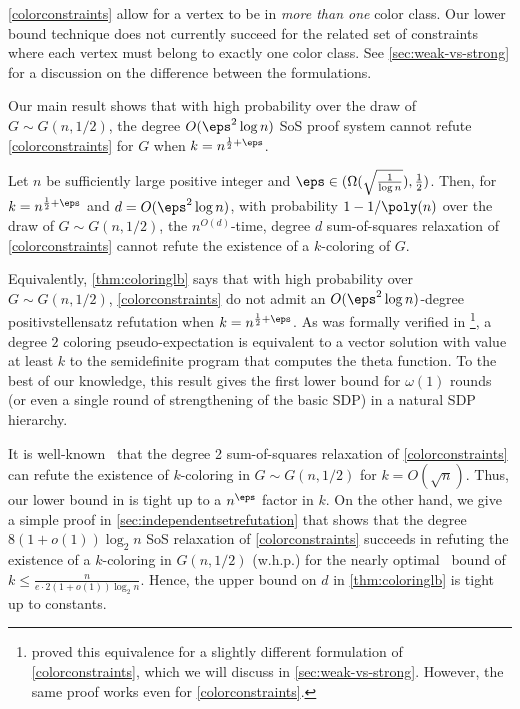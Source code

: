 \cref{colorconstraints} allow for a vertex to be in \emph{more than one} color class. Our lower bound technique does not currently succeed for the related set of constraints where each vertex must belong to exactly one color class. See \cref{sec:weak-vs-strong} for a discussion on the difference between the formulations.

Our main result shows that with high probability over the draw of $G \sim G(n,1/2)$, the degree $O(\eps^2 \log n)$ SoS proof system cannot refute \cref{colorconstraints} for $G$ when $k = n^{\frac{1}{2} + \eps}$. 

\begin{mtheorem}
\label{thm:coloringlb}
Let $n$ be sufficiently large positive integer and $\eps \in (\Omega(\sqrt{\frac{1}{\log n}}), \frac{1}{2})$. Then, for $k = n^{\frac{1}{2} + \eps}$ and $d = O(\eps^2 \log n)$, with probability $1 - 1/\poly(n)$ over the draw of $G \sim G(n,1/2)$, the $n^{O(d)}$-time, degree $d$ sum-of-squares relaxation of \cref{colorconstraints} cannot refute the existence of a $k$-coloring of $G$. 
\end{mtheorem}
Equivalently, \cref{thm:coloringlb} says that with high probability over $G \sim G(n,1/2)$, \cref{colorconstraints} do not admit an $O(\eps^2 \log n)$-degree positivstellensatz refutation when $k = n^{\frac{1}{2}+\eps}$. As was formally verified in \cite{DBLP:journals/siamcomp/BanksKM19}\footnote{\cite{DBLP:journals/siamcomp/BanksKM19} proved this equivalence for a slightly different formulation of \cref{colorconstraints}, which we will discuss in \cref{sec:weak-vs-strong}. However, the same proof works even for \cref{colorconstraints}.}, a degree $2$ coloring pseudo-expectation is equivalent to a vector solution with value at least $k$ to the semidefinite program that computes the \Lovasz theta function. To the best of our knowledge, this result gives the first lower bound for $\omega(1)$ rounds (or even a single round of strengthening of the basic SDP) in a natural SDP hierarchy.
 
\begin{remark} It is well-known~\cite{DBLP:journals/cpc/Coja-Oghlan05,DBLP:conf/approx/BanksKM17} that the degree 2 sum-of-squares relaxation of \cref{colorconstraints} can refute the existence of $k$-coloring in $G \sim G(n,1/2)$ for $k = O(\sqrt{n})$. Thus, our lower bound in  is tight up to a $n^{\eps}$ factor in $k$. On the other hand, we give a simple proof in \cref{sec:independentsetrefutation} that shows that the degree $8(1 + o(1)) \log_2 n$ SoS relaxation of \cref{colorconstraints} succeeds in refuting the existence of a $k$-coloring in $G(n,1/2)$ (w.h.p.) for the nearly optimal~\cite{MR951992} bound of $k \leq \frac{n}{e \cdot 2(1 + o(1))\log_2 n}$. Hence, the upper bound on $d$ in \cref{thm:coloringlb} is tight up to constants.
\end{remark}

